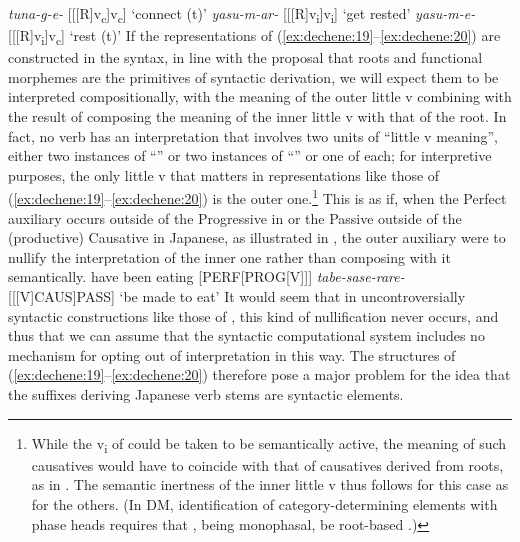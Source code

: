 \documentclass[output=paper,
modfonts
]{LSP/langsci}
\begin{document}
	\ex \label{ex:dechene:19b} \textit{tuna-g-e-} {[}{[}{[}R{]}v\textsubscript{c}{]}v\textsubscript{c}{]} `connect (t)'
	\z
\ex \label{ex:dechene:20} 
	\ea \label{ex:dechene:20a} \textit{yasu-m-ar-} {[}{[}{[}R{]}v\textsubscript{i}{]}v\textsubscript{i}{]} `get rested'
	\ex \label{ex:dechene:20b} \textit{yasu-m-e-} {[}{[}{[}R{]}v\textsubscript{i}{]}v\textsubscript{c}{]} `rest (t)'
	\z
\z
If the representations of (\ref{ex:dechene:19}--\ref{ex:dechene:20}) are constructed in the syntax, in
line with the proposal that roots and functional morphemes are the
primitives of syntactic derivation, we will expect them to be
interpreted compositionally, with the meaning of the outer little v
combining with the result of composing the meaning of the inner little v
with that of the root. In fact, no verb  has an interpretation that
involves two units of ``little v meaning'', either two instances of
``'' or two instances of ``'' or one of each; for
interpretive purposes, the only little v that matters in representations
like those of (\ref{ex:dechene:19}--\ref{ex:dechene:20}) is the outer one.\footnote{While the
  v\textsubscript{i} of  could be taken to be semantically active,
  the meaning of such causatives would have to coincide with that of
  causatives derived from roots, as in . The semantic inertness of
  the inner little v thus follows for this case as for the others. (In
  DM, identification of category-determining elements with phase heads
  requires that , being monophasal, be root-based
  \citep{marantz2007a}.)} This is as if, when the Perfect auxiliary occurs
outside of the Progressive in  or the Passive outside of the
(productive) Causative in Japanese, as illustrated in , the outer
auxiliary were to nullify the interpretation of the inner one rather
than composing with it semantically.
\ea \label{ex:dechene:21}
	\ea \label{ex:dechene:21a} have been eating { } {[}PERF{[}PROG{[}V{]}{]}{]}
	\ex \label{ex:dechene:21b} \textit{tabe-sase-rare-} { } {[}{[}{[}V{]}CAUS{]}PASS{]} `be made to eat'
	\z
\z
It would seem that in uncontroversially syntactic constructions like
those of , this kind of nullification never occurs, and thus that we
can assume that the syntactic computational system includes no mechanism
for opting out of  interpretation in this way. The
structures of (\ref{ex:dechene:19}--\ref{ex:dechene:20}) therefore pose a major problem for the idea that
the suffixes deriving Japanese verb stems are syntactic elements.
\end{document}
